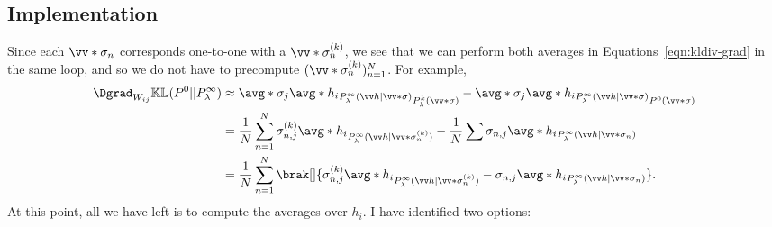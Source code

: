 \subsection{Implementation}
Since each $\vv*\sigma_n$ corresponds one-to-one with a $\vv*\sigma_n^{(k)}$, we see that we
can perform both averages in Equations~\eqref{eqn:kldiv-grad} in the same loop, and so we do
not have to precompute $(\vv*\sigma_n^{(k)})_{n=1}^N$. For example,
\begin{align*}
\Dgrad_{W_{ij}}\KL(\Pdat || \Peq)
&\approx \avg*{\sigma_j\avg*{h_i}_{\Peq(\vv h|\vv*\sigma)}}_{\Pk(\vv*\sigma)}
         - \avg*{\sigma_j\avg*{h_i}_{\Peq(\vv h|\vv*\sigma)}}_{\Pdat(\vv*\sigma)}
\\
&= \frac1N\sum_{n=1}^N\sigma_{n,j}^{(k)}\avg*{h_i}_{\Peq(\vv h|\vv*\sigma_n^{(k)})}
   - \frac1N\sum{\sigma_{n,j}\avg*{h_i}_{\Peq(\vv h|\vv*\sigma_n)}}
\\
&= \frac1N\sum_{n=1}^N
       \brak[]{\sigma_{n,j}^{(k)}\avg*{h_i}_{\Peq(\vv h|\vv*\sigma_n^{(k)})}
               - \sigma_{n,j}\avg*{h_i}_{\Peq(\vv h|\vv*\sigma_n)}}.
\end{align*}
At this point, all we have left is to compute the averages over $h_i$. I have identified two
options:
